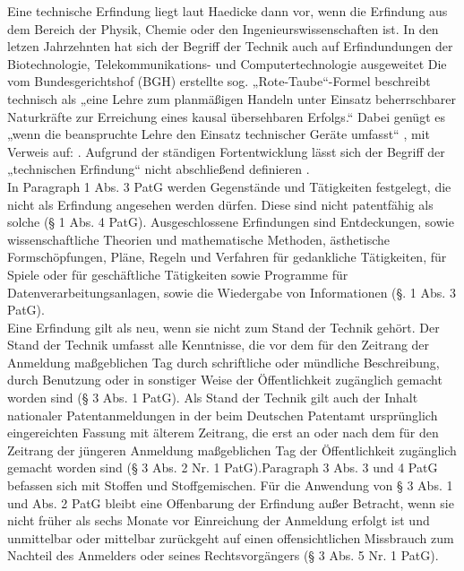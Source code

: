 Eine technische Erfindung liegt laut Haedicke dann vor, wenn die Erfindung aus dem Bereich der Physik, 
Chemie oder den Ingenieurswissenschaften ist.
In den letzen Jahrzehnten hat sich der Begriff der Technik auch auf Erfindundungen der Biotechnologie, 
Telekommunikations- und Computertechnologie ausgeweitet \cite{haedickeEinfuhrung2020}
Die vom Bundesgerichtshof (BGH) erstellte sog. „Rote-Taube“-Formel beschreibt technisch als  
„eine Lehre zum planmäßigen Handeln unter Einsatz beherrschbarer Naturkräfte zur Erreichung eines 
kausal übersehbaren Erfolgs.“\cite{BGH27031969}  
Dabei genügt es „wenn die beanspruchte Lehre den Einsatz technischer Geräte umfasst“
\cite{BGH3020152015},  
mit Verweis auf: \cite{BGH2420112011}. 
Aufgrund der ständigen
Fortentwicklung lässt sich der Begriff der „technischen Erfindung“ 
nicht abschließend definieren \cite{haedickeEinfuhrung2020}.
\\
In Paragraph 1 Abs. 3 PatG werden Gegenstände und Tätigkeiten festgelegt, 
die nicht als Erfindung angesehen werden dürfen. 
Diese sind nicht patentfähig als solche (§ 1 Abs. 4 PatG). 
Ausgeschlossene Erfindungen sind Entdeckungen, 
sowie wissenschaftliche Theorien und mathematische Methoden, 
ästhetische Formschöpfungen, Pläne, Regeln und Verfahren für gedankliche Tätigkeiten, 
für Spiele oder für geschäftliche Tätigkeiten sowie Programme für Datenverarbeitungsanlagen, 
sowie die Wiedergabe von Informationen (§. 1 Abs. 3 PatG). 
\\
Eine Erfindung gilt als neu, wenn sie nicht zum Stand der Technik gehört. Der
Stand der Technik umfasst alle Kenntnisse, die vor dem für den Zeitrang der Anmeldung
maßgeblichen Tag durch schriftliche oder mündliche Beschreibung, durch Benutzung oder in
sonstiger Weise der Öffentlichkeit zugänglich gemacht worden sind (§ 3 Abs. 1 PatG).
Als Stand der Technik gilt auch der Inhalt nationaler Patentanmeldungen in der beim Deutschen
Patentamt ursprünglich eingereichten Fassung mit älterem Zeitrang, die erst an oder nach dem für
den Zeitrang der jüngeren Anmeldung maßgeblichen Tag der Öffentlichkeit zugänglich gemacht
worden sind (§ 3 Abs. 2 Nr. 1 PatG).Paragraph 3 Abs. 3 und 4 PatG befassen sich mit Stoffen und Stoffgemischen. Für die Anwendung von § 3 Abs. 1 und Abs. 2 PatG bleibt eine Offenbarung der Erfindung außer Betracht, wenn sie nicht früher als sechs Monate vor Einreichung der Anmeldung erfolgt ist und
unmittelbar oder mittelbar zurückgeht auf einen offensichtlichen Missbrauch zum Nachteil des
Anmelders oder seines Rechtsvorgängers (§ 3 Abs. 5 Nr. 1 PatG).
\\
